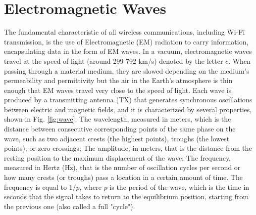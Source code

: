 \documentclass[binding=0.7cm, oneside]{sapthesis}
\begin{document}
\section{Electromagnetic Waves}
The fundamental characteristic of all wireless communications, including Wi-Fi transmission, is the use of Electromagnetic (EM) radiation to carry information,
encapsulating data in the form of EM waves. In a vacuum, electromagnetic waves travel at the speed of light (around 299 792 km/s) denoted by the letter $c$.
When passing through a material medium, they are slowed depending on the medium's permeability and permittivity but the air in the Earth's atmosphere is thin enough that EM waves
travel very close to the speed of light. Each wave is produced by a transmitting antenna (TX) that generates synchronous oscillations between electric and magnetic fields,
and it is characterized by several properties, shown in Fig. \ref{fig:wave}: The wavelength, measured in meters, which is the distance between consecutive corresponding points of the same phase on the wave, such as
two adjacent crests (the highest points), troughs (the lowest points), or zero crossings; The amplitude, in meters, that is the distance from the resting position to
the maximum displacement of the wave; The frequency, measured in Hertz (Hz), that is the number of oscillation cycles per second or
how many crests (or troughs) pass a location in a certain amount of time. The frequency is equal to $1/p$, where $p$ is the period of the wave, which is the time in seconds that the signal takes
to return to the equilibrium position, starting from the previous one (also called a full "cycle").
\end{document}
